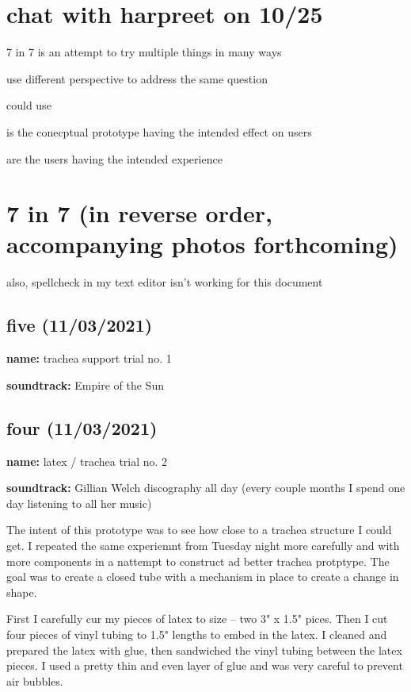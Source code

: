 \documentclass[11pt]{report}
\begin{document}
\clearpage
\section*{chat with harpreet on 10/25}

7 in 7 is an attempt to try multiple things in many ways

use different perspective to address the same question

could use 

is the conecptual prototype having the intended effect on users 

are the users having the intended experience  

\clearpage
\section*{{\LARGE7 in 7} (in reverse order, accompanying photos forthcoming)}
also, spellcheck in my text editor isn't working for this document


\newpage
\subsection*{five (11/03/2021)}
\textbf{name:} trachea support trial no. 1

\textbf{soundtrack:} Empire of the Sun




\newpage
\subsection*{four (11/03/2021)}
\textbf{name:} latex / trachea trial no. 2

\textbf{soundtrack:} Gillian Welch discography all day (every couple months I spend one day listening to all her music) 

The intent of this prototype was to see how close to a trachea structure I could get. I repeated the same experiemnt from Tuesday night more carefully and with more components in a nattempt to construct ad better trachea protptype. The goal was to create a closed tube with a mechanism in place to create a change in shape.

First I carefully cur my pieces of latex to size -- two 3" x 1.5" pices. Then I cut four pieces of vinyl tubing to 1.5" lengths to embed in the latex. I cleaned and prepared the latex with glue, then sandwiched the vinyl tubing between the latex pieces. I used a pretty thin and even layer of glue and was very careful to prevent air bubbles. 
\end{document}
